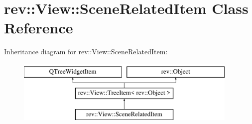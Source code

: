 \hypertarget{classrev_1_1_view_1_1_scene_related_item}{}\section{rev\+::View\+::Scene\+Related\+Item Class Reference}
\label{classrev_1_1_view_1_1_scene_related_item}
Inheritance diagram for rev\+::View\+::Scene\+Related\+Item\+:\begin{figure}[H]
\begin{center}
\leavevmode
\includegraphics[height=3.000000cm]{classrev_1_1_view_1_1_scene_related_item}
\end{center}
\end{figure}
